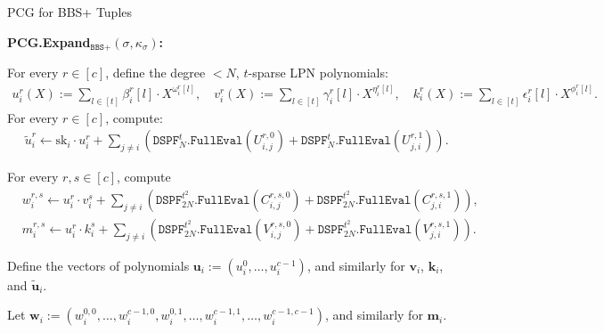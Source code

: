 \begin{specialconstruction}{PCG for BBS+ Tuples}
\vspace{1em} %

\textbf{PCG.Expand$_{\texttt{BBS+}}(\sigma, \kappa_\sigma)$:}

\begin{algorithmic}[1]
\State For every $r \in [c]$, define the degree $< N$, $t$-sparse LPN polynomials:
\begin{align*}
u_{i}^{r}(X):= \sum_{l \in [t]} \beta_{i}^{r}[l] \cdot X^{\omega_{i}^{r}[l]}, \quad  v_{i}^{r}(X):= \sum_{l \in [t]} \gamma_{i}^{r}[l] \cdot X^{\eta_{i}^{r}[l]}, \quad  k_{i}^{r}(X):= \sum_{l \in [t]} \epsilon_{i}^{r}[l] \cdot X^{\phi_{i}^{r}[l]}.
\end{align*}
\State For every $r \in [c]$, compute:
\begin{align*}
& \widetilde{u}_{i}^{r} \leftarrow \mathrm{sk}_{i} \cdot u_{i}^{r}+\sum_{j \neq i}\left(\texttt{DSPF}_{N}^{t}.\texttt{FullEval}\left(U_{i, j}^{r, 0}\right)+\texttt{DSPF}_{N}^{t}.\texttt{FullEval}\left(U_{j, i}^{r, 1}\right)\right).
\end{align*}

\State For every $r, s \in [c]$, compute
\begin{align*}
& w_{i}^{r, s} \leftarrow u_{i}^{r} \cdot v_{i}^{s}+\sum_{j \neq i}\left(\texttt{DSPF}_{2N}^{t^{2}}.\texttt{FullEval}\left(C_{i, j}^{r, s, 0}\right)+\texttt{DSPF}_{2N}^{t^{2}}.\texttt{FullEval}\left(C_{j, i}^{r, s, 1}\right)\right), \\
& m_{i}^{r, s} \leftarrow u_{i}^{r} \cdot k_{i}^{s}+\sum_{j \neq i}\left(\texttt{DSPF}_{2N}^{t^{2}}.\texttt{FullEval}\left(V_{i, j}^{r, s, 0}\right)+\texttt{DSPF}_{2N}^{t^{2}}.\texttt{FullEval}\left(V_{j, i}^{r, s, 1}\right)\right).
\end{align*}

\State Define the vectors of polynomials $\boldsymbol{u}_{i} := (u_{i}^{0}, \ldots, u_{i}^{c-1})$, and similarly for $\boldsymbol{v}_{i}$, $\boldsymbol{k}_{i}$, and $\widetilde{\boldsymbol{u}}_{i}$.

\State Let $\boldsymbol{w}_{i} := (w_{i}^{0,0}, \ldots, w_{i}^{c-1,0}, w_{i}^{0,1}, \ldots, w_{i}^{c-1,1}, \ldots, w_{i}^{c-1, c-1})$, and similarly for $\boldsymbol{m}_{i}$.


\end{algorithmic}
\end{specialconstruction}

